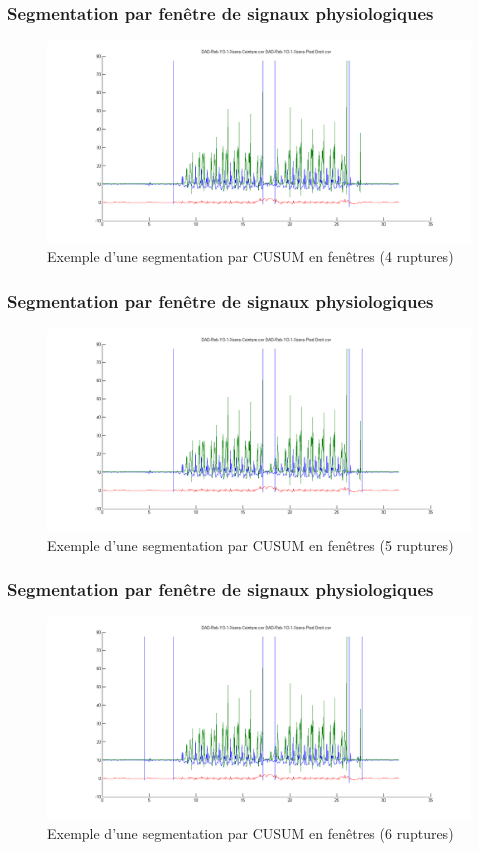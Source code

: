 \documentclass{beamer}
\begin{document}
\begin{frame}
	\frametitle{Segmentation par fenêtre de signaux physiologiques}
	\begin{figure}
		\includegraphics[scale=0.3]{seg4_win.png}
		\caption{Exemple d'une segmentation par CUSUM en fenêtres (4 ruptures)}
	\end{figure}
\end{frame}

\begin{frame}
	\frametitle{Segmentation par fenêtre de signaux physiologiques}
	\begin{figure}
		\includegraphics[scale=0.3]{seg5_win.png}
		\caption{Exemple d'une segmentation par CUSUM en fenêtres (5 ruptures)}
	\end{figure}
\end{frame}

\begin{frame}
	\frametitle{Segmentation par fenêtre de signaux physiologiques}
	\begin{figure}
		\includegraphics[scale=0.3]{seg6_win.png}
		\caption{Exemple d'une segmentation par CUSUM en fenêtres (6 ruptures)}
	\end{figure}
\end{frame}
\end{document}
